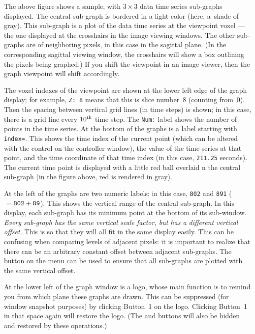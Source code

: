 The above figure shows a sample, with $3\times3$ data time series sub-graphs displayed.
The central sub-graph is bordered in a light color (here, a~shade of gray).
This sub-graph is a plot of the data time series at the viewpoint voxel --- the one
displayed at the crosshairs in the image viewing windows.  The other sub-graphs
are of neighboring pixels, in this case in the sagittal plane.  (In the
corresponding sagittal viewing window, the crosshairs will show a box
outlining the pixels being graphed.)  If you shift the viewpoint in
an image viewer, then the graph viewpoint will shift accordingly.

The voxel indexes of the viewpoint are shown at
the lower left edge of the graph display; for example, {\tt Z:~8} means
that this is slice number~8 (counting from~0).
Then the spacing between vertical grid lines (in time steps) is shown; in this
case, there is a grid line every $10^{\rm th}$ time step.  The {\tt Num:}
label shows the number of points in the time series.
At the bottom of the graphs is a label starting with {\tt index=}.
This shows the time index of the current point (which can be altered
with the  control on the \afnit controller window),
the value of the time series at that point, and the time coordinate
of that time index (in this case, {\tt 211.25} seconds).  The current time
point is displayed with a little red ball overlaid n the central sub-graph
(in the figure above, red is rendered in gray).

At the
left of the graphs are two numeric labels; in this case, {\tt 802}
and {\tt 891} (${}={\tt 802}+{\tt 89}$).
This shows the vertical range of the central sub-graph.
In this display, each sub-graph has its minimum point at the
bottom of its sub-window.  {\it Every sub-graph has the same vertical
scale factor, but has a different vertical offset.}  This is so
that they will all fit in the same display easily.  This can be
confusing when comparing levels of adjacent pixels: it is important
to realize that there can be an arbitrary constant offset between
adjacent sub-graphs.
The 
button on the  menu can be used
to ensure that all sub-graphs are plotted
with the same vertical offset.

At the lower left of the graph window is a logo, whose main function is to
remind you from which plane these graphs are drawn.  This can be
suppressed (for window snapshot purposes) by clicking Button~1 on the
logo.  Clicking Button~1 in that space again will restore the logo.
(The  and  buttons will also be hidden and
restored by these operations.)

